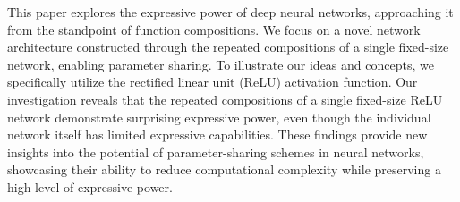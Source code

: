 \documentclass[nohyperref]{article}
\theoremstyle{plain}
\theoremstyle{definition}
\theoremstyle{remark}
\begin{document}
This paper explores the expressive power of deep neural networks, approaching it from the standpoint of function compositions. We focus on a novel network architecture constructed through the repeated compositions of a single fixed-size network, enabling parameter sharing. 
To illustrate our ideas and concepts, we specifically utilize the rectified linear unit (ReLU) activation function.
Our investigation reveals that
the repeated compositions of a single fixed-size ReLU network demonstrate surprising expressive power, even though the individual network itself has
limited expressive capabilities.
These findings provide new insights into the potential of parameter-sharing schemes in neural networks, showcasing their ability to reduce computational complexity while preserving a high level of expressive power.



\end{document}
